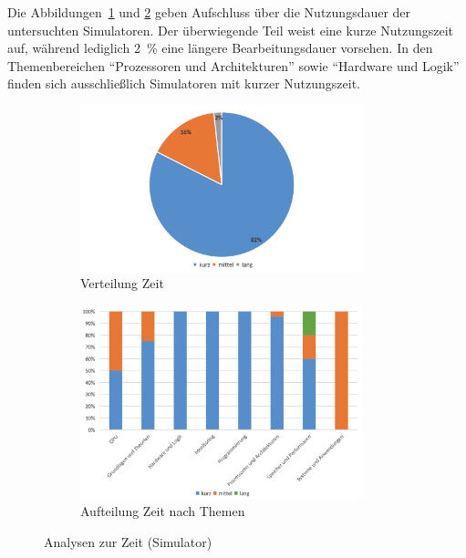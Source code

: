 Die Abbildungen~\ref{fig:12-zeit} und \ref{fig:13-vorwissen-thema} geben Aufschluss über die Nutzungsdauer der untersuchten Simulatoren. Der überwiegende Teil weist eine kurze Nutzungszeit auf, während lediglich 2~\% eine längere Bearbeitungsdauer vorsehen. In den Themenbereichen \enquote{Prozessoren und Architekturen} sowie \enquote{Hardware und Logik} finden sich ausschließlich Simulatoren mit kurzer Nutzungszeit.

\begin{figure}[!htbp]
    \centering
    \begin{subfigure}[b]{0.48\textwidth}
        \centering
        \includegraphics[width=0.90\textwidth]{graphics_sim/12-zeit.png}
        \caption{Verteilung Zeit}
        \label{fig:12-zeit}
    \end{subfigure}
    \hfill
    \begin{subfigure}[b]{0.48\textwidth}
        \centering
        \includegraphics[width=0.90\textwidth]{graphics_sim/13-zeit-thema.png}
        \caption{Aufteilung Zeit nach Themen}
        \label{fig:13-vorwissen-thema}
    \end{subfigure}
    \caption{Analysen zur Zeit (Simulator)}
    \label{fig:nutzungsdauer-gesamt}
\end{figure}

